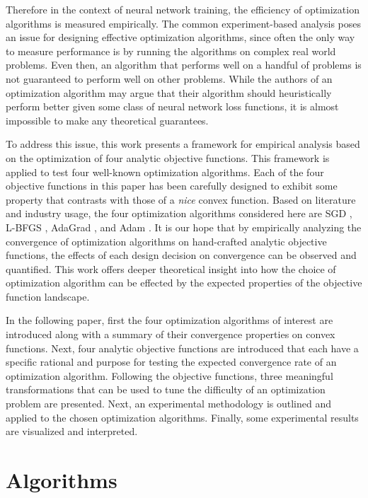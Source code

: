 \documentclass[letterpaper, 10 pt, conference]{IEEEtran}  %
\begin{document}
Therefore in the context of neural network training, the efficiency of
optimization algorithms is measured empirically.  The common
experiment-based analysis poses an issue for designing effective
optimization algorithms, since often the only way to measure
performance is by running the algorithms on complex real world
problems. Even then, an algorithm that performs well on a handful of
problems is not guaranteed to perform well on other problems.  While
the authors of an optimization algorithm may argue that their
algorithm should heuristically perform better given some class of
neural network loss functions, it is almost impossible to make any
theoretical guarantees.

To address this issue, this work presents a framework for empirical
analysis based on the optimization of four analytic objective
functions. This framework is applied to test four well-known
optimization algorithms.  Each of the four objective functions in this
paper has been carefully designed to exhibit some property that
contrasts with those of a \textit{nice} convex function.  Based on
literature and industry usage, the four optimization algorithms
considered here are SGD \cite{nemirovski2009robust}, L-BFGS
\cite{nocedal1980updating,liu1989limited}, AdaGrad
\cite{duchi2013proximal}, and Adam \cite{kingma2014adam}.  It is our
hope that by empirically analyzing the convergence of optimization
algorithms on hand-crafted analytic objective functions, the effects
of each design decision on convergence can be observed and quantified.
This work offers deeper theoretical insight into how the choice of
optimization algorithm can be effected by the expected properties of
the objective function landscape.

In the following paper, first the four optimization algorithms of
interest are introduced along with a summary of their convergence
properties on convex functions.  Next, four analytic objective
functions are introduced that each have a specific rational and
purpose for testing the expected convergence rate of an optimization
algorithm. Following the objective functions, three meaningful
transformations that can be used to tune the difficulty of an
optimization problem are presented. Next, an experimental methodology
is outlined and applied to the chosen optimization algorithms.
Finally, some experimental results are visualized and interpreted.

\section{Algorithms}
\label{sec:algorithms}
\end{document}

